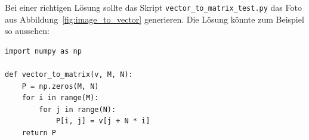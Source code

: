 \begin{losung*}
	Bei einer richtigen Lösung sollte das Skript \texttt{vector\_to\_matrix\_test.py} das Foto aus Abbildung~\ref{fig:image_to_vector} generieren.
	Die Lösung könnte zum Beispiel so aussehen:
\begin{lstlisting}[style=python]
import numpy as np

def vector_to_matrix(v, M, N):
	P = np.zeros(M, N)
	for i in range(M):
		for j in range(N):
			P[i, j] = v[j + N * i]
	return P
\end{lstlisting}
\end{losung*}